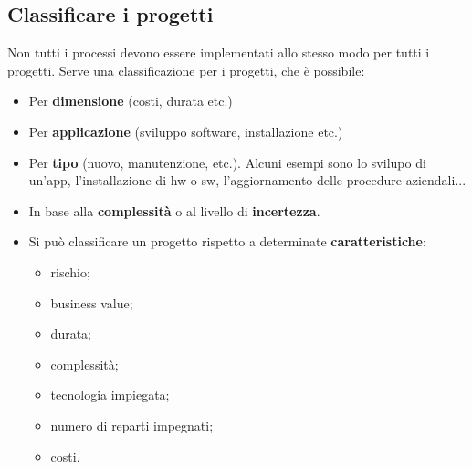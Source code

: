 \subsection{Classificare i progetti}
Non tutti i processi devono essere implementati allo stesso modo per tutti i progetti. Serve una classificazione per i progetti, che è possibile:
\begin{itemize}
	\item Per \textbf{dimensione} (costi, durata etc.)
	\item Per \textbf{applicazione} (sviluppo software, installazione etc.)
	\item Per \textbf{tipo} (nuovo, manutenzione, etc.). Alcuni esempi sono lo svilupo di un'app, l'installazione di hw o sw, l'aggiornamento delle procedure aziendali...
	\item In base alla \textbf{complessità} o al livello di \textbf{incertezza}.
	\item Si può classificare un progetto rispetto a determinate \textbf{caratteristiche}:
	\begin{itemize}
		\item rischio;
		\item business value;
		\item durata;
		\item complessità;
		\item tecnologia impiegata;
		\item numero di reparti impegnati;
		\item costi.
	\end{itemize}
\end{itemize}
